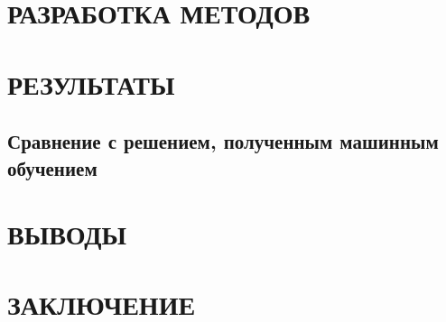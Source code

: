 \medskip


\clearpage
\section{\centering РАЗРАБОТКА МЕТОДОВ}



\clearpage
\section{\centering РЕЗУЛЬТАТЫ}

\clearpage
\subsection{Сравнение с решением, полученным машинным обучением}

\clearpage
\section{ВЫВОДЫ}

\clearpage
\section{ЗАКЛЮЧЕНИЕ}














